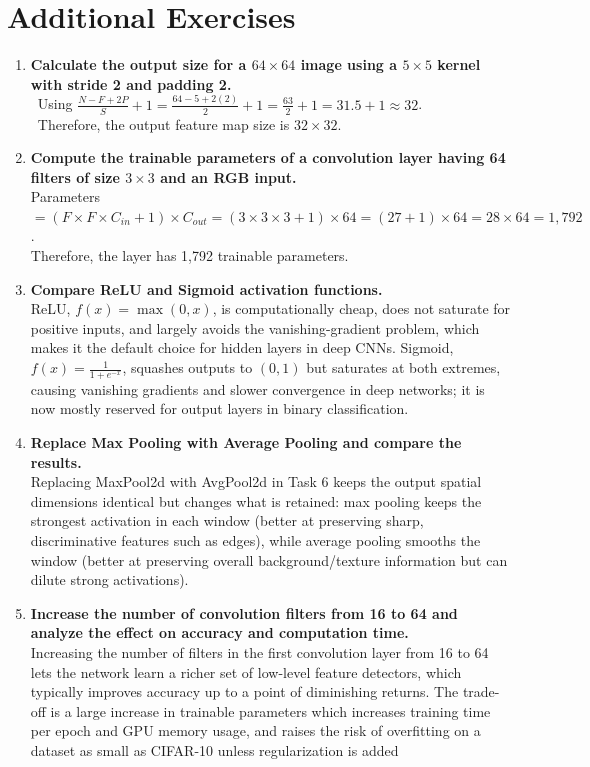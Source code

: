 \documentclass[11pt]{article}
\begin{document}
\section{Additional Exercises}
\begin{enumerate}
    \item \textbf{Calculate the output size for a $64\times64$ image using a $5\times5$ kernel with stride 2 and padding 2.} \\\
    Using $\frac{N-F+2P}{S}+1 = \frac{64-5+2(2)}{2}+1 = \frac{63}{2}+1 = 31.5+1 \approx 32$. \\\
    Therefore, the output feature map size is $32\times32$.\\

    \item \textbf{Compute the trainable parameters of a convolution layer having 64 filters of size $3\times3$ and an RGB input.} \\
    Parameters $= (F\times F\times C_{in} + 1)\times C_{out} = (3\times3\times3+1)\times64 = (27+1)\times64 = 28\times64 = 1{,}792$. \\
    Therefore, the layer has 1,792 trainable parameters.\\

    \item \textbf{Compare ReLU and Sigmoid activation functions.} \\
    ReLU, $f(x)=\max(0,x)$, is computationally cheap, does not saturate for positive inputs, and largely avoids the vanishing-gradient problem, which makes it the default choice for hidden layers in deep CNNs. Sigmoid, $f(x)=\frac{1}{1+e^{-x}}$, squashes outputs to $(0,1)$ but saturates at both extremes, causing vanishing gradients and slower convergence in deep networks; it is now mostly reserved for output layers in binary classification.

    \item \textbf{Replace Max Pooling with Average Pooling and compare the results.} \\
    Replacing MaxPool2d with AvgPool2d in Task 6 keeps the output spatial dimensions identical but
changes what is retained: max pooling keeps the strongest activation in each window (better at
preserving sharp, discriminative features such as edges), while average pooling smooths the window
(better at preserving overall background/texture information but can dilute strong activations).
\\

    \item \textbf{Increase the number of convolution filters from 16 to 64 and analyze the effect on accuracy and computation time.} \\
    Increasing the number of filters in the first convolution layer from 16 to 64 lets the network learn a richer set of low-level feature detectors, which typically improves accuracy up to a point of diminishing returns. The trade-off is a large increase in trainable parameters which increases training time per epoch and GPU memory
usage, and raises the risk of overfitting on a dataset as small as CIFAR-10 unless regularization is added\\
\end{enumerate}
\end{document}
